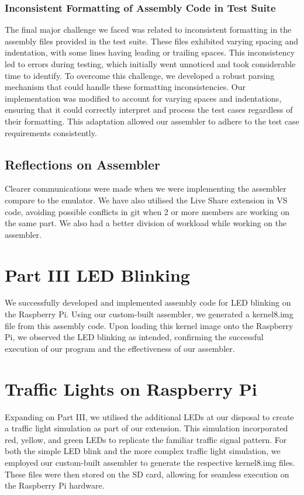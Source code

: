\documentclass[10pt]{article}
\begin{document}
\subsubsection{Inconsistent Formatting of Assembly Code in Test Suite}
The final major challenge we faced was related to inconsistent formatting in the assembly files provided in the test suite. These files exhibited varying spacing and indentation, with some lines having leading or trailing spaces. This inconsistency led to errors during testing, which initially went unnoticed and took considerable time to identify. To overcome this challenge, we developed a robust parsing mechanism that could handle these formatting inconsistencies. Our implementation was modified to account for varying spaces and indentations, ensuring that it could correctly interpret and process the test cases regardless of their formatting. This adaptation allowed our assembler to adhere to the test case requirements consistently.

\subsection{Reflections on Assembler}
Clearer communications were made when we were implementing the assembler compare to the emulator. We have also utilised the Live Share extension in VS code, avoiding possible conflicts in git when 2 or more members are working on the same part. We also had a better division of workload while working on the assembler.

\section{Part III LED Blinking}
We successfully developed and implemented assembly code for LED blinking on the Raspberry Pi. Using our custom-built assembler, we generated a kernel8.img file from this assembly code. Upon loading this kernel image onto the Raspberry Pi, we observed the LED blinking as intended, confirming the successful execution of our program and the effectiveness of our assembler.

\section{Traffic Lights on Raspberry Pi}

Expanding on Part III, we utilised the additional LEDs at our disposal to create a traffic light simulation as part of our extension. This simulation incorporated red, yellow, and green LEDs to replicate the familiar traffic signal pattern. For both the simple LED blink and the more complex traffic light simulation, we employed our custom-built assembler to generate the respective kernel8.img files. These files were then stored on the SD card, allowing for seamless execution on the Raspberry Pi hardware.
\end{document}
